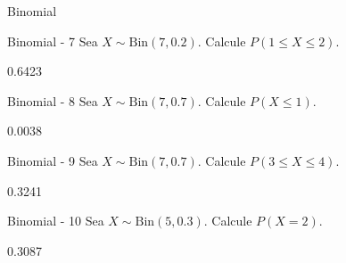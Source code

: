 \documentclass[a4,11pt]{aleph-notas}
\newcommand{\Bin}{\text{Bin}}
\begin{document}
\begin{quiz}{Binomial}
\begin{numerical}[tolerance=0.01]%
    {Binomial - 7}
    Sea \( X \sim \Bin(7,0.2) \). Calcule \( P(1 \leq X \leq 2) \).
    \item[] 0.6423
\end{numerical}

\begin{numerical}[tolerance=0.01]%
    {Binomial - 8}
    Sea \( X \sim \Bin(7,0.7) \). Calcule \( P(X \leq 1) \).
    \item[] 0.0038
\end{numerical}

\begin{numerical}[tolerance=0.01]%
    {Binomial - 9}
    Sea \( X \sim \Bin(7,0.7) \). Calcule \( P(3 \leq X \leq 4) \).
    \item[] 0.3241
\end{numerical}

\begin{numerical}[tolerance=0.01]%
    {Binomial - 10}
    Sea \( X \sim \Bin(5,0.3) \). Calcule \( P(X = 2) \).
    \item[] 0.3087
\end{numerical}




\end{quiz}
\end{document}
